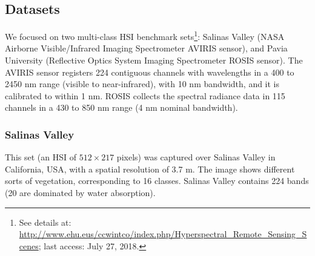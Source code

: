 \documentclass[journal]{IEEEtran}
\begin{document}
\subsection{Datasets}\label{sec:datasets}

We focused on two multi-class HSI benchmark sets\footnote{See details at: \url{http://www.ehu.eus/ccwintco/index.php/Hyperspectral_Remote_Sensing_Scenes}; last access: July 27, 2018.}: Salinas Valley (NASA Airborne Visible/Infrared Imaging Spectrometer AVIRIS sensor), and Pavia University (Reflective Optics System Imaging Spectrometer ROSIS sensor). The AVIRIS sensor registers 224 contiguous channels with wavelengths in a 400 to 2450 nm range (visible to near-infrared), with 10 nm bandwidth, and it is calibrated to within 1 nm. ROSIS collects the spectral radiance data in 115 channels in a 430 to 850 nm range (4 nm nominal bandwidth).

\subsubsection{Salinas Valley}

This set (an HSI of $512\times 217$ pixels) was captured over Salinas Valley in California, USA, with a spatial resolution of 3.7 m. The image shows different sorts of vegetation, corresponding to 16 classes. Salinas Valley contains 224 bands (20 are dominated by water absorption).

\end{document}
